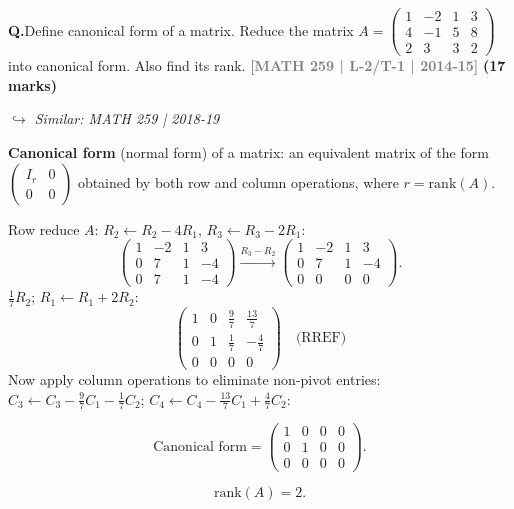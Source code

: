 \documentclass[12pt,a3paper]{article}
\newcommand{\yr}[1]{\hfill\textcolor{gray}{\small\textbf{[#1]}}}
\newcommand{\mk}[1]{\textcolor{orange!70!black}{\small\textbf{(#1 marks)}}}
\newcommand{\variant}[1]{\par\vspace{1pt}\textcolor{blue!50!black}%
  {\footnotesize\textit{$\hookrightarrow$ Similar: #1}}}
\newcounter{qnum}
\newcommand{\Q}[1]{%
  \needspace{4\baselineskip}
  \refstepcounter{qnum}
  \vspace{6pt}
  \noindent\textbf{Q\theqnum.}\enspace #1\par
}
\begin{document}
\Q{Define canonical form of a matrix. Reduce the matrix $A = \begin{pmatrix} 1 & -2 & 1 & 3 \\ 4 & -1 & 5 & 8 \\ 2 & 3 & 3 & 2 \end{pmatrix}$ into canonical form. Also find its rank.
\yr{MATH 259 | L-2/T-1 | 2014-15} \mk{17}
\variant{MATH 259 | 2018-19}}

\begin{tcolorbox}[enhanced,breakable,
  colback=cB!4,colframe=cB,boxrule=0.8pt,arc=5pt,
  title={\textbf{Answer --- Canonical Form of $A=\begin{pmatrix}1&-2&1&3\\4&-1&5&8\\2&3&3&2\end{pmatrix}$; Rank}},
  fonttitle=\bfseries\color{white},colbacktitle=cB]

\textbf{Canonical form} (normal form) of a matrix: an equivalent matrix of the form
$\begin{pmatrix}I_r & 0 \\ 0 & 0\end{pmatrix}$ obtained by both row and column operations, where $r=\mathrm{rank}(A)$.

\medskip
Row reduce $A$: $R_2\leftarrow R_2-4R_1$, $R_3\leftarrow R_3-2R_1$:
\[
\begin{pmatrix}1&-2&1&3\\0&7&1&-4\\0&7&1&-4\end{pmatrix}
\xrightarrow{R_3-R_2}
\begin{pmatrix}1&-2&1&3\\0&7&1&-4\\0&0&0&0\end{pmatrix}.
\]
$\frac{1}{7}R_2$; $R_1\leftarrow R_1+2R_2$:
\[
\begin{pmatrix}1&0&\frac{9}{7}&\frac{13}{7}\\0&1&\frac{1}{7}&-\frac{4}{7}\\0&0&0&0\end{pmatrix} \quad\text{(RREF)}
\]
Now apply column operations to eliminate non-pivot entries:
$C_3\leftarrow C_3-\frac{9}{7}C_1-\frac{1}{7}C_2$; $C_4\leftarrow C_4-\frac{13}{7}C_1+\frac{4}{7}C_2$:

\[
\text{Canonical form} = \begin{pmatrix}1&0&0&0\\0&1&0&0\\0&0&0&0\end{pmatrix}.
\]

\[
\boxed{\mathrm{rank}(A) = 2.}
\]

\end{tcolorbox}
\end{document}
